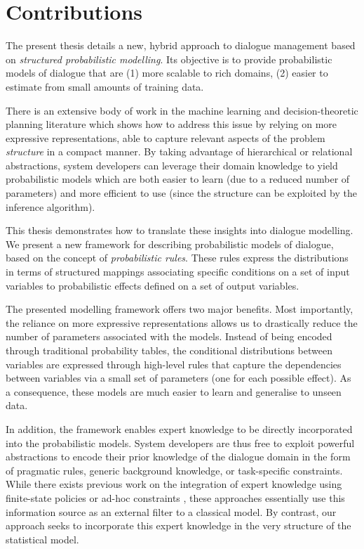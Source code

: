 \section{Contributions}

The present thesis details a new, hybrid approach to dialogue management based on \textit{structured probabilistic modelling}.  Its objective is to provide probabilistic models of dialogue that are (1) more scalable to rich domains, (2) easier to estimate from small amounts of training data.

There is an extensive body of work in the machine learning and decision-theoretic planning literature which shows how to address this issue by relying on more expressive representations, able to capture relevant aspects of the problem \textit{structure} in a compact manner. By taking advantage of hierarchical or relational abstractions, system developers can leverage their domain knowledge to yield probabilistic models which are both easier to learn (due to a reduced number of parameters) and more efficient to use (since the structure can be exploited by the inference algorithm).

This thesis demonstrates how to translate these insights into dialogue modelling. We present a new framework for describing probabilistic models of dialogue, based on the concept of \textit{probabilistic rules}.  These rules express the distributions in terms of structured mappings associating specific conditions on a set of input variables to probabilistic effects defined on a set of output variables. 

The presented modelling framework offers two major benefits. Most importantly, the reliance on more expressive representations allows us to drastically reduce the number of parameters associated with the models.  Instead of being encoded through traditional probability tables, the conditional distributions between variables are expressed through high-level rules that capture the dependencies between variables via a small set of parameters (one for each possible effect). As a consequence, these models are much easier to learn and generalise to unseen data. 

In addition, the framework enables expert knowledge to be directly incorporated into the probabilistic models. System developers are thus free to exploit powerful abstractions to encode their prior knowledge of the dialogue domain in the form of pragmatic rules, generic background knowledge, or task-specific constraints.  While there exists previous work on the integration of expert knowledge using finite-state policies or ad-hoc constraints \citep{heeman2007,williams2008}, these approaches essentially use this information source as an external filter to a classical model.  By contrast, our approach seeks to incorporate this expert knowledge in the very structure of the statistical model.

